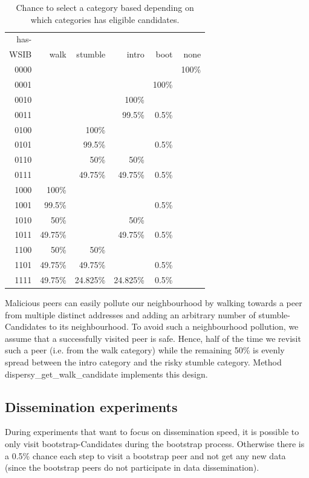 \begin{table}[htb]
\caption{\label{tbl:who-to-walk-towards}Chance to select a category based depending on which categories has eligible candidates.}
\centering
\begin{tabular}{r|rrrrr}
has- &  &  &  &  & \\
WSIB & walk & stumble & intro & boot & none\\
\hline
0000 &  &  &  &  & 100\%\\
0001 &  &  &  & 100\% & \\
0010 &  &  & 100\% &  & \\
0011 &  &  & 99.5\% & 0.5\% & \\
0100 &  & 100\% &  &  & \\
0101 &  & 99.5\% &  & 0.5\% & \\
0110 &  & 50\% & 50\% &  & \\
0111 &  & 49.75\% & 49.75\% & 0.5\% & \\
1000 & 100\% &  &  &  & \\
1001 & 99.5\% &  &  & 0.5\% & \\
1010 & 50\% &  & 50\% &  & \\
1011 & 49.75\% &  & 49.75\% & 0.5\% & \\
1100 & 50\% & 50\% &  &  & \\
1101 & 49.75\% & 49.75\% &  & 0.5\% & \\
1111 & 49.75\% & 24.825\% & 24.825\% & 0.5\% & \\
\end{tabular}
\end{table}

Malicious peers can easily pollute our neighbourhood by walking
towards a peer from multiple distinct addresses and adding an
arbitrary number of stumble-Candidates to its neighbourhood.  To avoid
such a neighbourhood pollution, we assume that a successfully visited
peer is safe.  Hence, half of the time we revisit such a peer
(i.e. from the walk category) while the remaining 50\% is evenly spread
between the intro category and the risky stumble category.  Method
dispersy\_get\_walk\_candidate implements this design.

\subsection{Dissemination experiments}
\label{sec-3-1}
During experiments that want to focus on dissemination speed, it is
possible to only visit bootstrap-Candidates during the bootstrap
process.  Otherwise there is a 0.5\% chance each step to visit a
bootstrap peer and not get any new data (since the bootstrap peers do
not participate in data dissemination).


